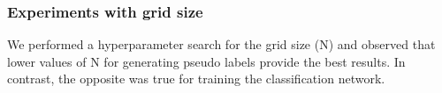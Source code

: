 

\subsubsection{Experiments with grid size}
\label{sec:grid}

We performed a hyperparameter search for the grid size (N) and observed that lower values of N for generating pseudo labels provide the best results. In contrast, the opposite was true for training the classification network. 


